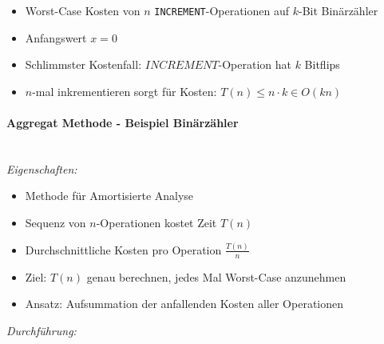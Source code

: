 \documentclass[
    ngerman,
    color=3b,
    dark_mode,
    load_common, %
    summary,
    boxarc,
]{tuda_summary}
\begin{document}
\begin{description}[leftmargin=6cm,itemsep=.8em]
\begin{itemize}
          \end{itemize}
    \item [Traditionelle Worst-Case Analyse]
          \begin{itemize}
              \item Worst-Case Kosten von $n$ \texttt{INCREMENT}-Operationen auf $k$-Bit Binärzähler
              \item Anfangswert $x = 0$
              \item Schlimmster Kostenfall: $INCREMENT$-Operation hat $k$ Bitflips
              \item $n$-mal inkrementieren sorgt für Kosten: $T(n) \leq n \cdot k \in O(kn)$
          \end{itemize}
\end{description}

\clearpage

\paragraph{Aggregat Methode - Beispiel Binärzähler}\mbox{}\vspace{1em}\\
\textit{Eigenschaften:}
\begin{itemize}
    \item Methode für Amortisierte Analyse
    \item Sequenz von $n$-Operationen kostet Zeit $T(n)$
    \item Durchschnittliche Kosten pro Operation $\frac{T(n)}{n}$
    \item Ziel: $T(n)$ genau berechnen,  jedes Mal Worst-Case anzunehmen
    \item Ansatz: Aufsummation der  anfallenden Kosten aller Operationen
\end{itemize}
\textit{Durchführung:}\\
\end{document}
